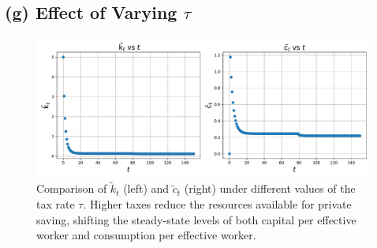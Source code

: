 \documentclass[12pt]{article}
\begin{document}
\subsection*{(g) Effect of Varying $\tau$}
\begin{figure}[H]
    \centering
    \includegraphics[width=1\textwidth]{4(g).pdf}
    \caption{Comparison of $\widetilde{k}_t$ (left) and $\widetilde{c}_t$ (right) under different 
    values of the tax rate $\tau$. Higher taxes reduce the resources available for private saving, 
    shifting the steady-state levels of both capital per effective worker and consumption per 
    effective worker.}
    \label{fig:4(g)}
\end{figure}
\end{document}
